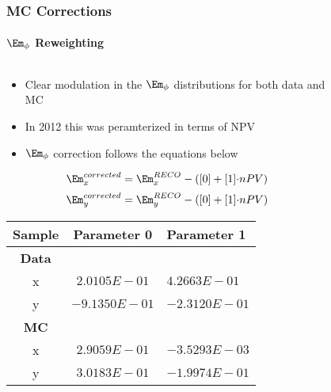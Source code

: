 \begin{frame}%
	\frametitle{MC Corrections}
	\framesubtitle{$\Em_{\phi}$ Reweighting}
	\vspace*{-0.54cm}
	\begin{columns}[T]
		\begin{column}{0.52\textwidth}
			\begin{block}{}
				\begin{itemize}
					\item Clear modulation in the $\Em_{\phi}$ distributions for both data and MC
					\item In 2012 this was peramterized in terms of NPV
					\item $\Em_{\phi}$ correction follows the equations below
				\end{itemize}
				\begin{equation}
				\Em_{x}^{corrected}=\Em_{x}^{RECO}-\left([0]+[1]{\cdot}nPV\right)\label{eq:METPhi_cor_x}
				\end{equation}
				\begin{equation}
				\Em_{y}^{corrected}=\Em_{y}^{RECO}-\left([0]+[1]{\cdot}nPV\right)\label{eq:METPhi_cor_y}
				\end{equation}
				\vspace*{-0.55cm}
				\begin{table}[hbtp]\footnotesize
					\centering
					\begin{tabular}{|c|c|l|}
					\hline\hline
					Sample & Parameter 0 & Parameter 1 \\
					\hline
					\textbf{Data} & & \\
					x & $2.0105E-01$ & $4.2663E-01$ \\
					\hline
					y & $-9.1350E-01$ & $-2.3120E-01$ \\
					\hline\hline
					\textbf{MC} & & \\
					x & $2.9059E-01$ & $-3.5293E-03$ \\
					\hline
					y & $3.0183E-01$ & $-1.9974E-01$ \\
					\hline\hline
					\end{tabular}
					\label{tab:METPhi_cor_xy}
				\end{table}
			\end{block}
		\end{column}
		\begin{column}{0.45\textwidth}
			\begin{figure}
				\centering

\end{figure}
\end{column}
\end{columns}
\end{frame}
